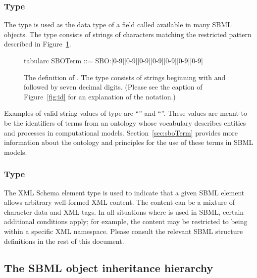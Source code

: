 \subsubsection{Type }
\label{sec:sboterm-type}

The type  is used as the data type of a field
called  available in many SBML objects.  The type
consists of strings of characters matching the restricted pattern
described in Figure~\ref{fig:sboterm}.

\begin{figure}[htb]
  \ttfamily
  \small
    \begin{center}
      \begin{edtable}{tabular}{c}
        SBOTerm ::= SBO:[0-9][0-9][0-9][0-9][0-9][0-9][0-9]
      \end{edtable}
    \end{center}
  \caption{The definition of .  The
     type consists of strings beginning with
     and followed by seven decimal digits.  (Please see
    the caption of Figure~\protect\ref{fig:id} for an explanation
    of the notation.)}
  \label{fig:sboterm}
\end{figure}

Examples of valid string values of type  are
``'' and ``''.  These values
are meant to be the identifiers of terms from an ontology whose
vocabulary describes entities and processes in computational
models.  Section~\ref{sec:sboTerm} provides more information about
the ontology and principles for the use of these terms in SBML
models.


\subsubsection{Type }
\label{sec:any}

The XML Schema element type  is used to indicate
that a given SBML element allows arbitrary well-formed XML
content.  The content can be a mixture of character data and XML
tags.  In all situations where  is used in SBML,
certain additional conditions apply; for example, the content may
be restricted to being within a specific XML namespace.  Please
consult the relevant SBML structure definitions in the rest of
this document.


\subsection{The SBML object inheritance hierarchy}
\label{sec:type-inheritance-hierarchy}

